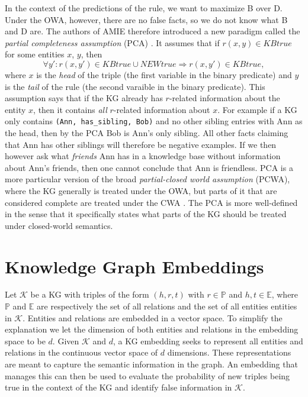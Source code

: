 In the context of the predictions of the rule, we want to maximize B over D. Under the OWA, however, there are no false facts, so we do not know what B and D are. The authors of AMIE therefore introduced a new paradigm called the \textit{partial completeness assumption} (PCA) \cite{amie}. It assumes that if $r(x, y) \in KB true$ for some entities $x$, $y$, then
\[\forall y' : r(x, y') \in KBtrue \cup NEWtrue \Rightarrow r(x, y') \in KBtrue,\]
where $x$ is the \textit{head} of the triple (the first variable in the binary predicate) and $y$ is the \textit{tail} of the rule (the second varaible in the binary predicate).
This assumption says that if the KG already has $r$-related information about the entity $x$,  then it contains \textit{all} $r$-related information about $x$. For example if a KG only contains \texttt{(Ann, has\_sibling, Bob)} and no other sibling entries with Ann as the head, then by the PCA Bob is Ann's only sibling. All other facts claiming that Ann has other siblings will therefore be negative examples. If we then however ask what \textit{friends} Ann has in a knowledge base without information about Ann's friends, then one cannot conclude that Ann is friendless. PCA is a more particular version of the broad \textit{partial-closed world assumption} (PCWA), where the KG generally is treated under the OWA, but parts of it that are considered complete are treated under the CWA \cite{motro1989integrity}. The PCA is more well-defined in the sense that it specifically states what parts of the KG should be treated under closed-world semantics.

\section{Knowledge Graph Embeddings}
\label{KG_embeddings}
Let $\mathcal{K}$ be a KG with triples of the form $(h, r, t)$ with $r\in \mathbb{P}$ and $h, t \in \mathbb{E}$, where $\mathbb{P}$ and $\mathbb{E}$ are respectively the set of all relations and the set of all entities entities in $\mathcal{K}$. Entities and relations are embedded in a vector space. To simplify the explanation we let the dimension of both entities and relations in the embedding space to be $d$.
Given $\mathcal{K}$ and $d$, a KG embedding seeks to represent all entities and relations in the continuous vector space of $d$ dimensions. These representations are meant to capture the semantic information in the graph. An embedding that manages this can then be used to evaluate the probability of new triples being true in the context of the KG and identify false information in $\mathcal{K}$.%

